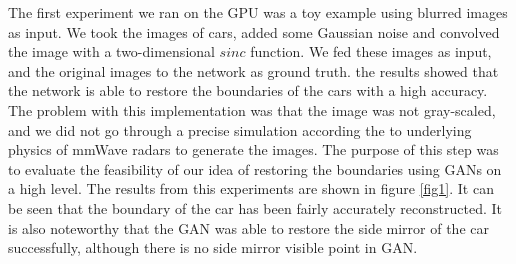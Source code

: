 The first experiment we ran on the GPU was a toy example using blurred images as input. We took the images of cars, added some Gaussian noise and convolved the image with a two-dimensional $sinc$ function. We fed these images as input, and the original images to the network as ground truth. the results showed that the network is able to restore the boundaries of the cars with a high accuracy. The problem with this implementation was that the image was not gray-scaled, and we did not go through a precise simulation according the to underlying physics of mmWave radars to generate the images. The purpose of this step was to evaluate the feasibility of our idea of restoring the boundaries using GANs on a high level. The results from this experiments are shown in figure \ref{fig1}. It can be seen that the boundary of the car has been fairly accurately reconstructed. It is also noteworthy that the GAN was able to restore the side mirror of the car successfully, although there is no side mirror visible point in GAN. 


